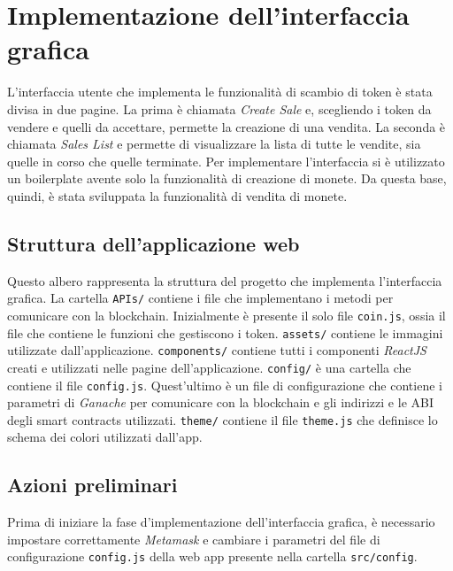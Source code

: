 \documentclass[a4paper]{article}
\begin{document}
        \newpage
        \section{Implementazione dell'interfaccia grafica}
        L'interfaccia utente che implementa le funzionalità di scambio di token è stata divisa in due pagine.
        La prima è chiamata \emph{Create Sale} e, scegliendo i token da vendere e quelli da accettare, permette
        la creazione di una vendita. La seconda è chiamata \emph{Sales List} e permette di visualizzare la lista di tutte le vendite, sia quelle in corso
        che quelle terminate.
        \newline
        Per implementare l'interfaccia si è utilizzato un boilerplate avente solo la funzionalità di creazione di monete\cite{boilerplate}. Da questa base, quindi, è stata sviluppata la funzionalità di vendita di monete. 

        \subsection{Struttura dell'applicazione web}
        Questo albero rappresenta la struttura del progetto che implementa l'interfaccia grafica. La cartella \verb|APIs/| contiene i file che implementano i metodi per comunicare con la blockchain.
        Inizialmente è presente il solo file \verb|coin.js|, ossia il file che contiene le funzioni che gestiscono i token.
        \newline
        \verb|assets/| contiene le immagini utilizzate dall'applicazione.
        \newline
        \verb|components/| contiene tutti i componenti \emph{ReactJS} creati e utilizzati nelle pagine dell'applicazione.
        \newline
        \verb|config/| è una cartella che contiene il file \verb|config.js|. Quest'ultimo è un file di configurazione che contiene i parametri di \emph{Ganache} per comunicare con la blockchain e gli indirizzi e le ABI degli smart contracts utilizzati.
        \newline
        \verb|theme/| contiene il file \verb|theme.js| che definisce lo schema dei colori utilizzati dall'app.

        \subsection{Azioni preliminari}
        Prima di iniziare la fase d'implementazione dell'interfaccia grafica, è necessario impostare correttamente \emph{Metamask} e cambiare i parametri del file di configurazione \verb|config.js| della web app presente nella cartella \verb|src/config|.
\end{document}

